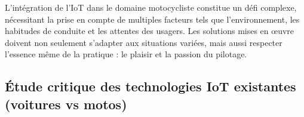\vspace{0.5cm}
L’intégration de l’IoT dans le domaine motocycliste constitue un défi complexe, nécessitant la prise en compte de multiples facteurs tels que l’environnement, les habitudes de conduite et les attentes des usagers. Les solutions mises en œuvre doivent non seulement s’adapter aux situations variées, mais aussi respecter l’essence même de la pratique : le plaisir et la passion du pilotage.

\newpage
\subsection{ Étude critique des technologies IoT existantes (voitures vs motos)}

